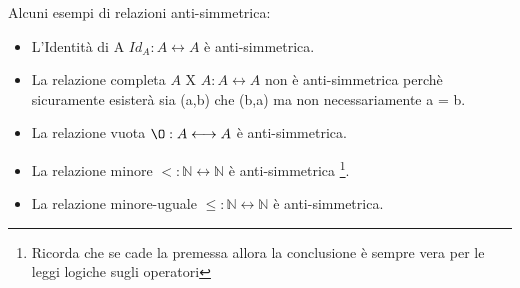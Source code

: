 \begin{example}
Alcuni esempi di relazioni anti-simmetrica:
    \begin{itemize}
        \item L'Identità di A $Id_A: A \longleftrightarrow A$ è anti-simmetrica.
        \item La relazione completa $A$ X $A:A \longleftrightarrow A$ non è anti-simmetrica perchè sicuramente esisterà sia (a,b) che (b,a) ma non necessariamente a = b.
        \item La relazione vuota $\O: A \longleftrightarrow A$ è anti-simmetrica.
        \item La relazione minore $<: \mathbb{N} \longleftrightarrow \mathbb{N}$ è anti-simmetrica \footnote{Ricorda che se cade la premessa allora la conclusione è sempre vera per le leggi logiche sugli operatori}.
        \item La relazione minore-uguale $\leq: \mathbb{N} \longleftrightarrow \mathbb{N}$ è anti-simmetrica.
    \end{itemize}
\end{example}

